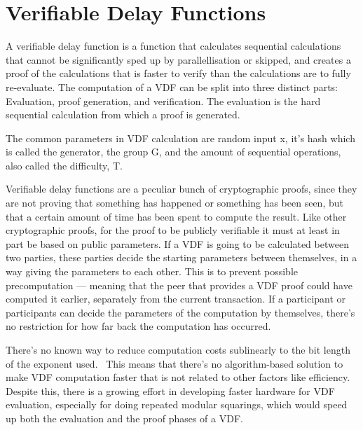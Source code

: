 \chapter{Verifiable Delay Functions}
\label{Verifiable Delay Functions}

A verifiable delay function is a function that calculates sequential calculations that cannot be significantly sped up by parallellisation or skipped, and creates a proof of the calculations that is faster to verify than the calculations are to fully re-evaluate. The computation of a VDF can be split into three distinct parts: Evaluation, proof generation, and verification. The evaluation is the hard sequential calculation from which a proof is generated.  

The common parameters in VDF calculation are random input x, it's hash which is called the generator, the group G, and the amount of sequential operations, also called the difficulty, T.

Verifiable delay functions are a peculiar bunch of cryptographic proofs, since they are not proving that something has happened or something has been seen, but that a certain amount of time has been spent to compute the result. Like other cryptographic proofs, for the proof to be publicly verifiable it must at least in part be based on public parameters. If a VDF is going to be calculated between two parties, these parties decide the starting parameters between themselves, in a way giving the parameters to each other. This is to prevent possible precomputation --- meaning that the peer that provides a VDF proof could have computed it earlier, separately from the current transaction. If a participant or participants can decide the parameters of the computation by themselves, there's no restriction for how far back the computation has occurred.

There's no known way to reduce computation costs sublinearly to the bit length of the exponent used.~\cite{Boneh2018-sm} This means that there's no algorithm-based solution to make VDF computation faster that is not related to other factors like efficiency. Despite this, there is a growing effort in developing faster hardware for VDF evaluation, especially for doing repeated modular squarings, which would speed up both the evaluation and the proof phases of a VDF. 

